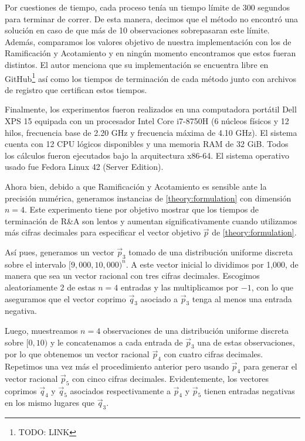 Por cuestiones de tiempo, cada proceso tenía un tiempo límite de 300 segundos para terminar de
correr. De esta manera, decimos que el método no encontró una solución en caso de que más de 10
observaciones sobrepasaran este límite. Además, comparamos los valores objetivo de nuestra
implementación con los de Ramificación y Acotamiento y en ningún momento encontramos que estos
fueran distintos. El autor menciona que su implementación se encuentra libre en
GitHub\footnote{TODO: LINK} así como los tiempos de terminación de cada método junto con archivos de
registro que certifican estos tiempos.

Finalmente, los experimentos fueron realizados en una computadora portátil Dell XPS 15 equipada con
un procesador Intel Core i7-8750H (6 núcleos físicos y 12 hilos, frecuencia base de 2.20 GHz y
frecuencia máxima de 4.10 GHz). El sistema cuenta con 12 CPU lógicos disponibles y una memoria RAM
de 32 GiB. Todos los cálculos fueron ejecutados bajo la arquitectura x86-64. El sistema operativo
usado fue Fedora Linux 42 (Server Edition).

Ahora bien, debido a que Ramificación y Acotamiento es sensible ante la precisión numérica,
generamos instancias de \eqref{theory:formulation} con dimensión $n = 4$. Este experimento tiene por
objetivo mostrar que los tiempos de terminación de R\&A son lentos y aumentan significativamente
cuando utilizamos más cifras decimales para especificar el vector objetivo $\vec{p}$ de
\eqref{theory:formulation}.

Así pues, generamos un vector $\vec{p}_3$ tomado de una distribución uniforme discreta sobre el
intervalo $[9{,}000, 10{,}000)^n$. A este vector inicial lo dividimos por 1{,}000, de manera que sea un
vector racional con tres cifras decimales. Escogimos aleatoriamente 2 de estas $n = 4$ entradas y
las multiplicamos por $-1$, con lo que aseguramos que el vector coprimo $\vec{q}_3$ asociado a
$\vec{p}_3$ tenga al menos una entrada negativa.

Luego, muestreamos $n = 4$ observaciones de una distribución uniforme discreta sobre $[0, 10)$ y le
concatenamos a cada entrada de $\vec{p}_3$ una de estas observaciones, por lo que obtenemos un
vector racional $\vec{p}_4$ con cuatro cifras decimales. Repetimos una vez más el procedimiento
anterior pero usando $\vec{p}_4$ para generar el vector racional $\vec{p}_5$ con cinco cifras
decimales. Evidentemente, los vectores coprimos $\vec{q}_4$ y $\vec{q}_5$ asociados respectivamente
a $\vec{p}_4$ y $\vec{p}_5$ tienen entradas negativas en los mismo lugares que $\vec{q}_3$.

